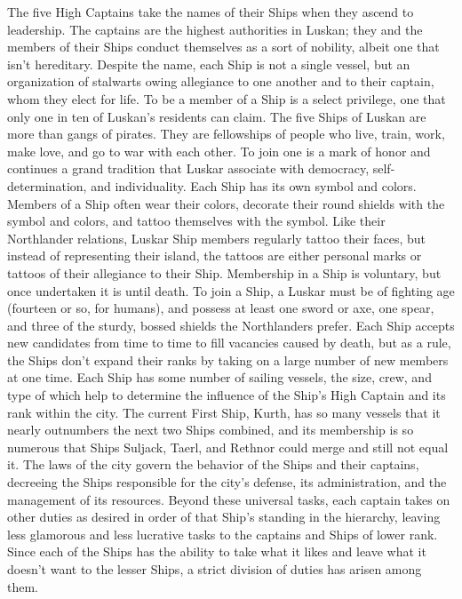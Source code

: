 \documentclass[10pt,a4paper,twoside,twocolumn,openany,bg=print,nodeprecatedcode]{dndbook}
\begin{document}
The five High Captains take the names of their Ships when they ascend to leadership. The captains are the highest authorities in Luskan; they and the members of their Ships conduct themselves as a sort of nobility, albeit one that isn't hereditary.
Despite the name, each Ship is not a single vessel, but an organization of stalwarts owing allegiance to one another and to their captain, whom they elect for life. To be a member of a Ship is a select privilege, one that only one in ten of Luskan's residents can claim.
The five Ships of Luskan are more than gangs of pirates. They are fellowships of people who live, train, work, make love, and go to war with each other. To join one is a mark of honor and continues a grand tradition that Luskar associate with democracy, self-determination, and individuality.
Each Ship has its own symbol and colors. Members of a Ship often wear their colors, decorate their round shields with the symbol and colors, and tattoo themselves with the symbol. Like their Northlander relations, Luskar Ship members regularly tattoo their faces, but instead of representing their island, the tattoos are either personal marks or tattoos of their allegiance to their Ship.
Membership in a Ship is voluntary, but once undertaken it is until death. To join a Ship, a Luskar must be of fighting age (fourteen or so, for humans), and possess at least one sword or axe, one spear, and three of the sturdy, bossed shields the Northlanders prefer. Each Ship accepts new candidates from time to time to fill vacancies caused by death, but as a rule, the Ships don't expand their ranks by taking on a large number of new members at one time.
Each Ship has some number of sailing vessels, the size, crew, and type of which help to determine the influence of the Ship's High Captain and its rank within the city. The current First Ship, Kurth, has so many vessels that it nearly outnumbers the next two Ships combined, and its membership is so numerous that Ships Suljack, Taerl, and Rethnor could merge and still not equal it.
The laws of the city govern the behavior of the Ships and their captains, decreeing the Ships responsible for the city's defense, its administration, and the management of its resources. Beyond these universal tasks, each captain takes on other duties as desired in order of that Ship's standing in the hierarchy, leaving less glamorous and less lucrative tasks to the captains and Ships of lower rank.
Since each of the Ships has the ability to take what it likes and leave what it doesn't want to the lesser Ships, a strict division of duties has arisen among them.
\end{document}
